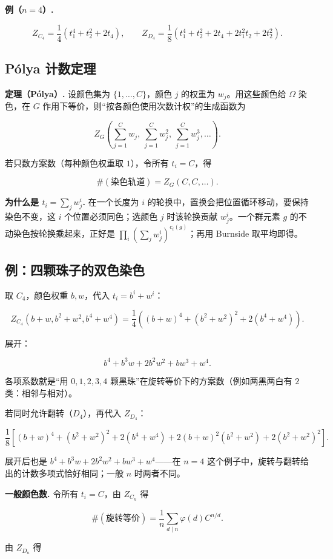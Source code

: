 \textbf{例（$n=4$）.}

\[
Z_{C_4}=\frac14\left(t_1^4+t_2^2+2t_4\right),\qquad
Z_{D_4}=\frac18\left(t_1^4+t_2^2+2t_4+2t_1^2t_2+2t_2^2\right).
\]

\subsection{Pólya 计数定理}


\textbf{定理（Pólya）.} 设颜色集为 $\{1,\dots,C\}$，颜色 $j$ 的权重为 $w_j$。用这些颜色给 $\Omega$ 染色，在 $G$ 作用下等价，则“按各颜色使用次数计权”的生成函数为

\[
Z_G\left(\sum_{j=1}^{C}w_j,\ \sum_{j=1}^{C}w_j^2,\ \sum_{j=1}^{C}w_j^3,\dots\right).
\]

若只数方案数（每种颜色权重取 $1$），令所有 $t_i=C$，得

\[
\#(\text{染色轨道})=Z_G(C,C,\dots).
\]

\textbf{为什么是 $t_i=\sum_j w_j^i$.} 在一个长度为 $i$ 的轮换中，置换会把位置循环移动，要保持染色不变，这 $i$ 个位置必须同色；选颜色 $j$ 时该轮换贡献 $w_j^i$。一个群元素 $g$ 的不动染色按轮换乘起来，正好是 $\prod_i(\sum_jw_j^i)^{c_i(g)}$；再用 Burnside 取平均即得。

\subsection{例：四颗珠子的双色染色}


取 $C_4$，颜色权重 $b,w$，代入 $t_i=b^i+w^i$：

\[
Z_{C_4}(b+w,b^2+w^2,b^4+w^4)
=\frac14\left((b+w)^4+(b^2+w^2)^2+2(b^4+w^4)\right).
\]

展开：

\[
b^4+b^3w+2b^2w^2+bw^3+w^4.
\]

各项系数就是“用 $0,1,2,3,4$ 颗黑珠”在旋转等价下的方案数（例如两黑两白有 $2$ 类：相邻与相对）。

若同时允许翻转（$D_4$），再代入 $Z_{D_4}$：

\[
\frac18\left[(b+w)^4+(b^2+w^2)^2+2(b^4+w^4)+2(b+w)^2(b^2+w^2)+2(b^2+w^2)^2\right].
\]

展开后也是 $b^4+b^3w+2b^2w^2+bw^3+w^4$——在 $n=4$ 这个例子中，旋转与翻转给出的计数多项式恰好相同；一般 $n$ 时两者不同。

\textbf{一般颜色数.} 令所有 $t_i=C$，由 $Z_{C_n}$ 得

\[
\#(\text{旋转等价})= \frac1n\sum_{d\mid n}\varphi(d)C^{n/d}.
\]

由 $Z_{D_n}$ 得

